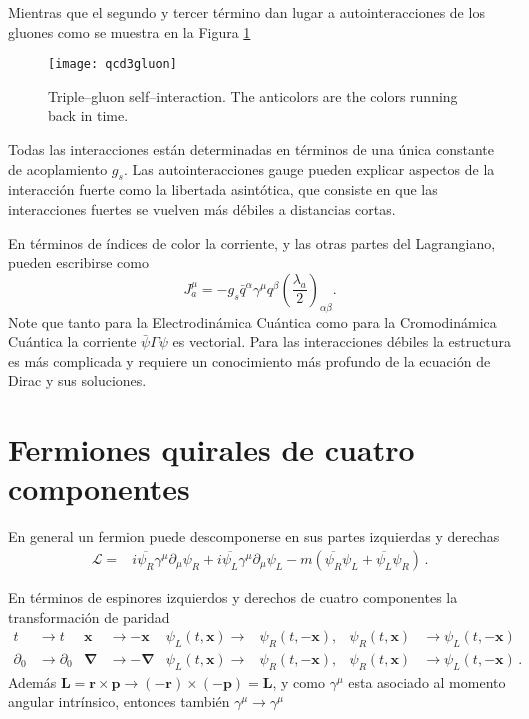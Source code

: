 Mientras que el segundo y tercer término dan lugar a autointeracciones de los gluones como se muestra en la Figura \ref{fig:qcd3gluon}
\begin{figure}
  \centering
  \texttt{[image: qcd3gluon]}%
  \caption{Triple--gluon self--interaction. The anticolors are the colors running back in time.}
  \label{fig:qcd3gluon}
\end{figure}


Todas las interacciones están determinadas en términos de una única constante de acoplamiento $g_s$. Las autointeracciones gauge pueden explicar aspectos de la interacción fuerte como la libertada asintótica, que consiste en que las interacciones fuertes se vuelven más débiles a distancias cortas. 

En términos de índices de color la corriente, y las otras partes del Lagrangiano, pueden escribirse como
\begin{equation}
  \label{eq:223qft}
  J^\mu_a=-g_s\bar{q}^\alpha\gamma^\mu q^\beta\left(\frac{\lambda_a}{2}\right)_{\alpha\beta}.
\end{equation}
Note que tanto para la Electrodinámica Cuántica como para la Cromodinámica Cuántica la corriente $\bar{\psi}\Gamma\psi$ es vectorial. Para las interacciones débiles la estructura es más complicada y requiere un conocimiento más profundo de la ecuación de Dirac y sus soluciones.


\section{Fermiones quirales de cuatro componentes}
\label{sec:ferm-quir-de}
En general un fermion puede descomponerse en sus partes izquierdas y derechas
\begin{align}
  \mathcal{L}  =&i\overline{\psi_R}\gamma^\mu\partial_\mu\psi_R+i\overline{\psi_L}\gamma^\mu\partial_\mu\psi_L-m(\overline{\psi_R}\psi_L+\overline{\psi_L}\psi_R)\,.
\end{align}



En términos de espinores izquierdos y derechos de cuatro componentes la transformación de paridad 
\begin{align}
  \label{eq:220qft}
  t&\to t&\mathbf{x}&\to -\mathbf{x}&\psi_L(t,\mathbf{x})\to&\psi_R(t,-\mathbf{x}),& \psi_R(t,\mathbf{x})&\to\psi_L(t,-\mathbf{x})\nonumber\\
  \partial_0&\to \partial_0&\boldsymbol{\nabla}&\to -\boldsymbol{\nabla}&\psi_L(t,\mathbf{x})\to&\psi_R(t,-\mathbf{x}),& \psi_R(t,\mathbf{x})&\to\psi_L(t,-\mathbf{x})\,.
\end{align}
Además $\mathbf{L}=\mathbf{r}\times \mathbf{p}\to(-\mathbf{r})\times (-\mathbf{p})=\mathbf{L}$, y como $\gamma^\mu$ esta asociado al momento angular intrínsico, entonces también $\gamma^\mu\to\gamma^\mu$


